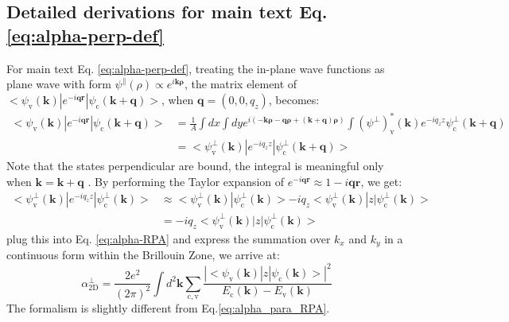 \documentclass[manuscript=suppinfo,email=true,hyperref=true,keywords=false]{achemso}
\begin{document}
\subsection{Detailed derivations for main text Eq. \ref{eq:alpha-perp-def}}
\label{ssec:theory-2}

For main text Eq. \ref{eq:alpha-perp-def}, treating the in-plane
wave functions as plane wave with form
$\psi^{\parallel}(\rho) \propto e^{i \mathbf{k \rho}}$, the matrix
element of
$<\psi_{\mathrm{v}}(\mathbf{k})|e^{-i\mathbf{qr}}|\psi_{\mathrm{c}}(\mathbf{k+q})>$,
when $\mathbf{q}=(0, 0, q_{z})$, becomes\cite{Hybertsen_1987}:
\begin{equation}
  \begin{aligned}
    \label{eq:matrix-z}
  <\psi_{\mathrm{v}}(\mathbf{k})|e^{-i\mathbf{qr}}|\psi_{\mathrm{c}}(\mathbf{k+q})>
  &= \frac{1}{A} \int dx \int dy
  e^{i(\mathbf{-k \rho} - \mathbf{q \rho} + \mathbf{(k+q) \rho})}
  \int (\psi^{\perp})^{*}_{\mathrm{v}}(\mathbf{k})e^{-iq_{z}z}\psi^{\perp}_{\mathrm{c}}(\mathbf{k+q})\\
  &= <\psi^{\perp}_{\mathrm{v}}(\mathbf{k})|e^{-iq_{z}z}|\psi^{\perp}_{\mathrm{c}}(\mathbf{k+q})>
  \end{aligned}
\end{equation}
Note that the states perpendicular are bound, the integral is
meaningful only when $\mathbf{k=k+q}$ \cite{davies_physics_1997}. By
performing the Taylor expansion of
$e^{-i\mathbf{qr}} \approx 1 - i\mathbf{qr}$, we get:
\begin{equation}
  \begin{aligned}
    \label{eq:matrix-z-2}
    <\psi^{\perp}_{\mathrm{v}}(\mathbf{k})|e^{-iq_{z}z}|\psi^{\perp}_{\mathrm{c}}(\mathbf{k})>
    &\approx <\psi^{\perp}_{\mathrm{v}}(\mathbf{k})|\psi^{\perp}_{\mathrm{c}}(\mathbf{k})> -
    iq_{z} <\psi^{\perp}_{\mathrm{v}}(\mathbf{k})|z|\psi^{\perp}_{\mathrm{c}}(\mathbf{k})>\\
    &= -iq_{z} <\psi^{\perp}_{\mathrm{v}}(\mathbf{k})|z|\psi^{\perp}_{\mathrm{c}}(\mathbf{k})>
   \end{aligned}
\end{equation}
plug this into Eq. \ref{eq:alpha-RPA} and express the summation over
$k_{x}$ and $k_{y}$ in a continuous form within the Brillouin Zone, we
arrive at:
\begin{equation}
\label{eq:alpha_perp_RPA}
\alpha_{\mathrm{2D}}^{\perp} = \frac{2e^{2}}{(2 \pi) ^{2}} \int d^{2}\mathbf{k}
\sum_{\mathrm{c, v}}
\frac{|<\psi_{\mathrm{v}}(\mathbf{k})|z|\psi_{\mathrm{c}}(\mathbf{k})>|^{2}}
{E_{\mathrm{c}}(\mathbf{k}) - E_{\mathrm{v}}(\mathbf{k})}
\end{equation}
The formalism is slightly different from Eq.\ref{eq:alpha_para_RPA}.
\end{document}
